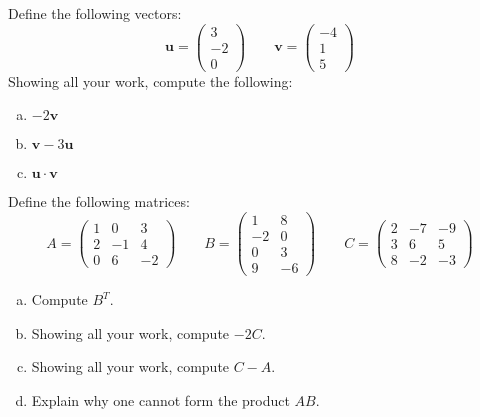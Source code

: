 \documentclass[12pt,letterpaper]{exam}
\begin{document}
\examtitle
{} 
\scores
\bottomline
\newpage

\begin{questions}

\newpage
\question[10] Define the following vectors:
	\[
	\mathbf{u}= \begin{pmatrix} 3 \\ -2 \\ 0 \end{pmatrix} \qquad 
	\mathbf{v}= \begin{pmatrix} -4 \\ 1 \\ 5 \end{pmatrix}
	\]
Showing all your work, compute the following:
	\begin{enumerate}[(a)]
	\item $-2 \mathbf{v}$
	\item $\mathbf{v} - 3 \mathbf{u}$
	\item $\mathbf{u} \cdot \mathbf{v}$
	\end{enumerate}



\newpage
\question[10] Define the following matrices:
	\[
	A= \begin{pmatrix} 1 & 0 & 3 \\ 2 & -1 & 4 \\ 0 & 6 & -2 \end{pmatrix} \qquad
	B= \begin{pmatrix} 1 & 8 \\ -2 & 0 \\ 0 & 3 \\ 9 & -6 \end{pmatrix} \qquad
	C= \begin{pmatrix} 2 & -7 & -9 \\ 3 & 6 & 5 \\ 8 & -2 & -3 \end{pmatrix}
	\]

\begin{enumerate}[(a)]
\item Compute $B^T$. 
\item Showing all your work, compute $-2C$.
\item Showing all your work, compute $C - A$. 
\item Explain why one cannot form the product $AB$. 
\end{enumerate}




\end{questions}
\end{document}
